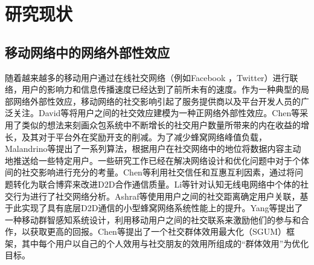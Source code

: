 


\section{研究现状}
\subsection{移动网络中的网络外部性效应}


随着越来越多的移动用户通过在线社交网络（例如Facebook \cite{FB}，Twitter\cite{Twitter}）进行联络，用户的影响力和信息传播速度已经达到了前所未有的速度\cite{Niyato}。作为一种典型的局部网络外部性效应，移动网络的社交影响引起了服务提供商以及平台开发人员的广泛关注。David等\cite{David10}将用户之间的社交效应建模为一种正网络外部性效应。Chen等\cite{Baochun}采用了类似的想法来刻画众包系统中不断增长的社交用户数量所带来的内在收益的增长，及其对于平台外在奖励开支的削减。为了减少蜂窝网络峰值负载，Malandrino等\cite{social}提出了一系列算法，根据用户在社交网络中的地位将数据内容主动地推送给一些特定用户。一些研究工作已经在解决网络设计和优化问题中对于个体间的社交影响进行充分的考量。Chen等\cite{Chen13}利用社交信任和互惠互利因素，通过将问题转化为联合博弈来改进D2D合作通信质量。Li等\cite{li2011propagation}针对认知无线电网络中个体的社交行为进行了社交网络分析。Ashraf等\cite{Ashraf}使用用户之间的社交距离确定用户关联，基于此实现了具有底层D2D通信的小型蜂窝网络系统性能上的提升。Yang等\cite{Guang}提出了一种移动群智感知系统设计，利用移动用户之间的社交联系来激励他们的参与和合作，以获取更高的回报。Chen等\cite{Chen14}提出了一个社交群体效用最大化（SGUM）框架，其中每个用户以自己的个人效用与社交朋友的效用所组成的“群体效用”为优化目标。


